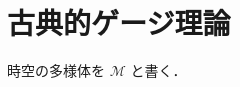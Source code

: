 \documentclass[TQFT_main]{subfiles}
\begin{document}

\section{古典的ゲージ理論}

時空の多様体を $\mathcal{M}$ と書く．

\end{document}
